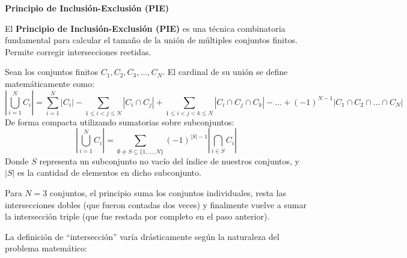 \documentclass[11pt,a4paper]{article}
\begin{document}
\begin{center}
    {\huge \textbf{Principio de Inclusión-Exclusión (PIE)}} \\[0.2cm]
    \vspace{0.5cm}
\end{center}
El \textbf{Principio de Inclusión-Exclusión (PIE)} es una técnica combinatoria fundamental para calcular el tamaño de la unión de múltiples conjuntos finitos. Permite corregir intersecciones reetidas.\par
Sean los conjuntos finitos $C_1, C_2, C_3, \dots, C_N$. El cardinal de su unión se define matemáticamente como:
\begin{equation}
    \left| \bigcup_{i=1}^{N} C_i \right| = \sum_{i=1}^{N} |C_i| - \sum_{1 \leqslant i < j \leqslant N} |C_i \cap C_j| + \sum_{1 \leqslant i < j < k \leqslant N} |C_i \cap C_j \cap C_k| - \dots + (-1)^{N-1} |C_1 \cap C_2 \cap \dots \cap C_N|
\end{equation}
De forma compacta utilizando sumatorias sobre subconjuntos:
\begin{equation}
    \left| \bigcup_{i=1}^{N} C_i \right| = \sum_{\emptyset \neq S \subseteq \{1, \dots, N\}} (-1)^{|S|-1} \left| \bigcap_{i \in S} C_i \right|
\end{equation}
Donde $S$ representa un subconjunto no vacío del índice de nuestros conjuntos, y $|S|$ es la cantidad de elementos en dicho subconjunto.\par
Para $N = 3$ conjuntos, el principio suma los conjuntos individuales, resta las intersecciones dobles (que fueron contadas dos veces) y finalmente vuelve a sumar la intersección triple (que fue restada por completo en el paso anterior).
\begin{center}
\end{center}
La definición de ``intersección'' varía drásticamente según la naturaleza del problema matemático:
\end{document}
